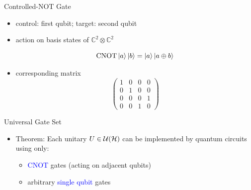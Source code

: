 \documentclass[slideColor]{prosper}
\renewcommand{\>}{\rangle}
\newcommand{\<}{\langle}
\newcommand{\cH}{{\mathcal H}}
\begin{document}
\begin{slide}{Controlled-NOT Gate}

\begin{itemize}
\item control: first qubit; \quad target: second qubit
\quad{}

\bigskip
\item action on basis states of $\mathbb{C}^2\otimes\mathbb{C}^2$

\[
\textrm{CNOT}\left\vert{a}\right\rangle\left\vert{b}\right\rangle = \left\vert{a}\right\rangle\left\vert{a\oplus b}\right\rangle
\]

\bigskip
\item corresponding matrix
\[
\left(
\begin{array}{cccc}
1      & 0      & 0      & 0 \\
0      & 1      & 0      & 0 \\
0      & 0      & 0      & 1 \\
0      & 0      & 1      & 0
\end{array}
\right)
\]
\end{itemize}
\end{slide}


\begin{slide}{Universal Gate Set}

\begin{itemize}
\item Theorem: Each unitary $U\in {\cal U}(\cH)$ can be
implemented by quantum circuits using only:

\medskip
\begin{itemize}
\item \textcolor{blue}{CNOT} gates (acting on adjacent qubits)

\bigskip
\item arbitrary \textcolor{blue}{single qubit} gates
\end{itemize}
\end{itemize}

\end{slide}

\end{document}
